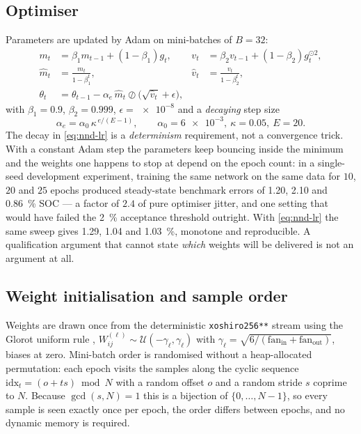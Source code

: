 \subsection{Optimiser}
Parameters are updated by Adam \citep{kingma2015adam} on mini-batches of $B=32$:
\begin{align}
m_t &= \beta_1 m_{t-1} + (1-\beta_1) g_t, &
v_t &= \beta_2 v_{t-1} + (1-\beta_2) g_t^{\odot 2}, \label{eq:nnd-adam1}\\
\hat m_t &= \frac{m_t}{1-\beta_1^t}, &
\hat v_t &= \frac{v_t}{1-\beta_2^t}, \label{eq:nnd-adam2}\\
\theta_t &= \theta_{t-1} - \alpha_e\, \hat m_t \oslash \bigl(\sqrt{\hat v_t} + \epsilon\bigr), &&
\label{eq:nnd-adam3}
\end{align}
with $\beta_1 = 0.9$, $\beta_2 = 0.999$, $\epsilon = \num{e-8}$ and a \emph{decaying} step size
\begin{equation}\label{eq:nnd-lr}
\alpha_e = \alpha_0\, \kappa^{\,e/(E-1)},\qquad \alpha_0 = \num{6e-3},\ \kappa = 0.05,\ E = 20 .
\end{equation}
The decay in \cref{eq:nnd-lr} is a \emph{determinism} requirement, not a convergence trick.  With a
constant Adam step the parameters keep bouncing inside the minimum and the weights one happens to
stop at depend on the epoch count: in a single-seed development experiment, training the same
network on the same data for $10$, $20$ and $25$ epochs produced steady-state benchmark errors of
\SI{1.20}{}, \SI{2.10}{} and \SI{0.86}{\percent} SOC --- a factor of $2.4$ of pure optimiser
jitter, and one setting that would have failed the \SI{2}{\percent} acceptance threshold outright.
With \cref{eq:nnd-lr} the same sweep gives \SI{1.29}{}, \SI{1.04}{} and \SI{1.03}{\percent},
monotone and reproducible.  A qualification argument that cannot state \emph{which} weights will be
delivered is not an argument at all.

\subsection{Weight initialisation and sample order}
Weights are drawn once from the deterministic \texttt{xoshiro256**} stream
\citep{blackman2021xoshiro} using the Glorot uniform rule \citep{glorot2010init},
$W^{(\ell)}_{ij}\sim \mathcal{U}(-\gamma_\ell,\gamma_\ell)$ with
$\gamma_\ell = \sqrt{6/(\mathrm{fan_{in}}+\mathrm{fan_{out}})}$, biases at zero.  Mini-batch order
is randomised without a heap-allocated permutation: each epoch visits the samples along the cyclic
sequence $\mathrm{idx}_t = (o + t s) \bmod N$ with a random offset $o$ and a random stride $s$
coprime to $N$.  Because $\gcd(s,N)=1$ this is a bijection of $\{0,\dots,N-1\}$, so every sample is
seen exactly once per epoch, the order differs between epochs, and no dynamic memory is required.

